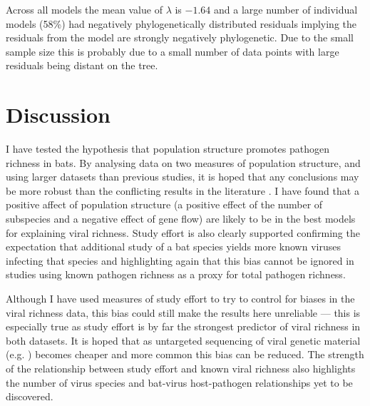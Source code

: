 Across all models the mean value of $\lambda$ is \ensuremath{-1.64} and a large number of individual models (58\%)  had negatively phylogenetically distributed residuals implying the residuals from the model are strongly negatively phylogenetic.
Due to the small sample size this is probably due to a small number of data points with large residuals being distant on the tree.







\section{Discussion}  



I have tested the hypothesis that population structure promotes pathogen richness in bats.
By analysing data on two measures of population structure, and using larger datasets than previous studies, it is hoped that any conclusions may be more robust than the conflicting results in the literature \cite{gay2014parasite, turmelle2009correlates, maganga2014bat}.
I have found that a positive affect of population structure (a positive effect of the number of subspecies and a negative effect of gene flow) are likely to be in the best models for explaining viral richness.
Study effort is also clearly supported confirming the expectation that additional study of a bat species yields more known viruses infecting that species and highlighting again that this bias cannot be ignored in studies using known pathogen richness as a proxy for total pathogen richness.



Although I have used measures of study effort to try to control for biases in the viral richness data, this bias could still make the results here unreliable --- this is especially true as study effort is by far the strongest predictor of viral richness in both datasets.
It is hoped that as untargeted sequencing of viral genetic material (e.g. \textcite{anthony2013strategy}) becomes cheaper and more common this bias can be reduced.
The strength of the relationship between study effort and known viral richness also highlights the number of virus species and bat-virus host-pathogen relationships yet to be discovered.


